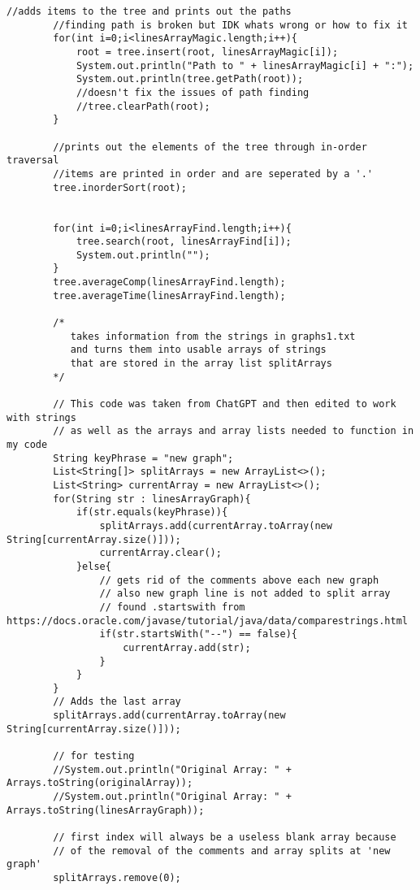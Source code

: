 \documentclass[10pt]{article}
\begin{document}
\begin{lstlisting}[frame=single, ]
        //adds items to the tree and prints out the paths
        //finding path is broken but IDK whats wrong or how to fix it
        for(int i=0;i<linesArrayMagic.length;i++){
            root = tree.insert(root, linesArrayMagic[i]);
            System.out.println("Path to " + linesArrayMagic[i] + ":");
            System.out.println(tree.getPath(root));
            //doesn't fix the issues of path finding
            //tree.clearPath(root);
        }
        
        //prints out the elements of the tree through in-order traversal
        //items are printed in order and are seperated by a '.'
        tree.inorderSort(root);


        for(int i=0;i<linesArrayFind.length;i++){
            tree.search(root, linesArrayFind[i]);
            System.out.println("");
        }
        tree.averageComp(linesArrayFind.length);
        tree.averageTime(linesArrayFind.length);

        /*
           takes information from the strings in graphs1.txt
           and turns them into usable arrays of strings
           that are stored in the array list splitArrays
        */

        // This code was taken from ChatGPT and then edited to work with strings
        // as well as the arrays and array lists needed to function in my code 
        String keyPhrase = "new graph";
        List<String[]> splitArrays = new ArrayList<>();
        List<String> currentArray = new ArrayList<>();
        for(String str : linesArrayGraph){
            if(str.equals(keyPhrase)){
                splitArrays.add(currentArray.toArray(new String[currentArray.size()]));
                currentArray.clear();
            }else{
                // gets rid of the comments above each new graph
                // also new graph line is not added to split array
                // found .startswith from https://docs.oracle.com/javase/tutorial/java/data/comparestrings.html
                if(str.startsWith("--") == false){
                    currentArray.add(str);
                }
            }
        }
        // Adds the last array
        splitArrays.add(currentArray.toArray(new String[currentArray.size()]));

        // for testing
        //System.out.println("Original Array: " + Arrays.toString(originalArray));
        //System.out.println("Original Array: " + Arrays.toString(linesArrayGraph));

        // first index will always be a useless blank array because
        // of the removal of the comments and array splits at 'new graph'
        splitArrays.remove(0);


\end{lstlisting}
\end{document}
